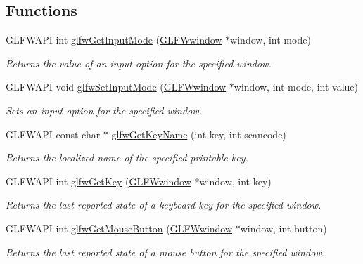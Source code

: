 \subsection*{Functions}
\begin{DoxyCompactItemize}
\item 
G\+L\+F\+W\+A\+PI int \hyperlink{group__input_ga1248dd5b1e566b2817e71547564d6af9}{glfw\+Get\+Input\+Mode} (\hyperlink{group__window_ga3c96d80d363e67d13a41b5d1821f3242}{G\+L\+F\+Wwindow} $\ast$window, int mode)
\begin{DoxyCompactList}\small\item\em Returns the value of an input option for the specified window. \end{DoxyCompactList}\item 
G\+L\+F\+W\+A\+PI void \hyperlink{group__input_gae1eb729d2dd91dc33fd60e150a6e1684}{glfw\+Set\+Input\+Mode} (\hyperlink{group__window_ga3c96d80d363e67d13a41b5d1821f3242}{G\+L\+F\+Wwindow} $\ast$window, int mode, int value)
\begin{DoxyCompactList}\small\item\em Sets an input option for the specified window. \end{DoxyCompactList}\item 
G\+L\+F\+W\+A\+PI const char $\ast$ \hyperlink{group__input_ga98293ec4493cfe8e7df8ff22ee402b46}{glfw\+Get\+Key\+Name} (int key, int scancode)
\begin{DoxyCompactList}\small\item\em Returns the localized name of the specified printable key. \end{DoxyCompactList}\item 
G\+L\+F\+W\+A\+PI int \hyperlink{group__input_ga7d8ad8ffaf272808f04e1d5d33ec8859}{glfw\+Get\+Key} (\hyperlink{group__window_ga3c96d80d363e67d13a41b5d1821f3242}{G\+L\+F\+Wwindow} $\ast$window, int key)
\begin{DoxyCompactList}\small\item\em Returns the last reported state of a keyboard key for the specified window. \end{DoxyCompactList}\item 
G\+L\+F\+W\+A\+PI int \hyperlink{group__input_ga6da5efb04f700c312a57a169fa9393a0}{glfw\+Get\+Mouse\+Button} (\hyperlink{group__window_ga3c96d80d363e67d13a41b5d1821f3242}{G\+L\+F\+Wwindow} $\ast$window, int button)
\begin{DoxyCompactList}\small\item\em Returns the last reported state of a mouse button for the specified window. \end{DoxyCompactList}\item 

\end{DoxyCompactItemize}
